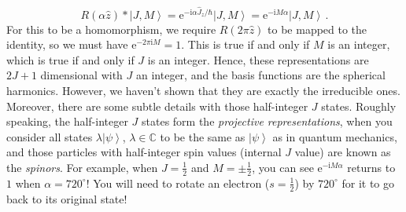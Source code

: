 \documentclass{article}
\theoremstyle{plain}\theoremheaderfont{\normalfont\itshape}\theorembodyfont{\rmfamily}\theoremseparator{.}\newtheorem*{rem}{Remark}\newtheorem*{ex}{Example}\newtheorem*{proof}{Proof}\newtheorem*{altp}{Alternative proof}
\theoremstyle{plain}\theoremheaderfont{\normalfont\bfseries}\theorembodyfont{\rmfamily}\theoremseparator{.}\newtheorem{thm}{Theorem}[section]\newtheorem{lem}[thm]{Lemma}\newtheorem{prop}[thm]{Proposition}\newtheorem*{cor}{Corollary}\newtheorem{defn}[thm]{Definition}\newtheorem{clm}[thm]{Claim}\newtheorem{clminproof}{Claim}\newtheorem*{law}{Law}\newtheorem{pos}[thm]{Postulate}
\theoremstyle{break}\theoremheaderfont{\normalfont\itshape}\theorembodyfont{\rmfamily}\theoremseparator{.\medskip}\newtheorem*{proofskip}{Proof}\newtheorem*{exs}{Examples}\newtheorem*{rems}{Remarks}
\theoremstyle{break}\theoremheaderfont{\normalfont\bfseries}\theorembodyfont{\rmfamily}\theoremseparator{.\medskip}\newtheorem{lemskip}[thm]{Lemma}\newtheorem{defnskip}[thm]{Definition}\newtheorem{propskip}[thm]{Proposition}\newtheorem{thmskip}[thm]{Theorem}
\numberwithin{equation}{section}
\newcommand{\ii}{\mathrm{i}}
\newcommand{\ee}{\mathrm{e}}
\newcommand{\ket}[1]{\left| #1 \right\rangle}
\newcommand{\CC}{\mathbb{C}}
\begin{document}
\begin{enumerate}[topsep=0pt,label=(\roman*)]
{        \begin{equation}
            R(\alpha\hat{z})*\ket{J,M}=\ee^{-\ii\alpha\hat{J}_z/\hbar}\ket{J,M}=\ee^{-\ii M\alpha}\ket{J,M}\,.
        \end{equation}
        For this to be a homomorphism, we require \(R(2\pi\hat{z})\) to be mapped to the identity, so we must have \(\ee^{-2\pi\ii M}=1\). This is true if and only if \(M\) is an integer, which is true if and only if \(J\) is an integer. Hence, these representations are \(2J+1\) dimensional with \(J\) an integer, and the basis functions are the spherical harmonics. However, we haven't shown that they are exactly the irreducible ones. Moreover, there are some subtle details with those half-integer \(J\) states. Roughly speaking, the half-integer \(J\) states form the \textit{projective representations}, when you consider all states \(\lambda\ket{\psi}\), \(\lambda\in\CC\) to be the same as \(\ket{\psi}\) as in quantum mechanics, and those particles with half-integer spin values (internal \(J\) value) are known as the \textit{spinors}. For example, when \(J=\frac{1}{2}\) and \(M=\pm\frac{1}{2}\), you can see \(\ee^{-\ii M\alpha}\) returns to \(1\) when \(\alpha=720^\circ\)! You will need to rotate an electron (\(s=\frac{1}{2}\)) by \(720^\circ\) for it to go back to its original state!}
    \end{enumerate}
\end{document}
